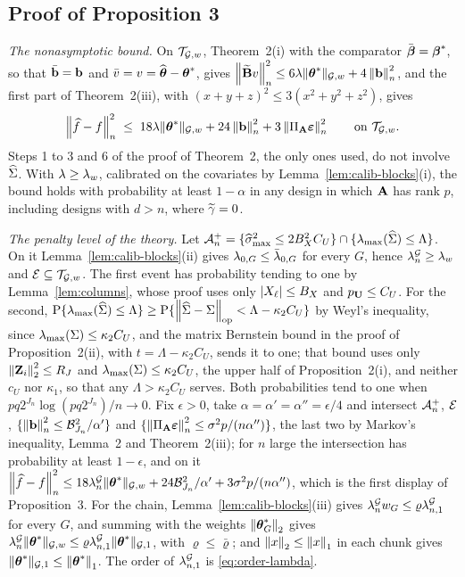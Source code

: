 \subsection*{Proof of Proposition 3}

\emph{The nonasymptotic bound.} On $\mathcal{T}_{\mathcal{G},w}$, Theorem~2(i) with the comparator
$\bar{\boldsymbol{\beta}} = \boldsymbol{\beta}^{*}$, so that $\bar{\mathbf{b}} = \mathbf{b}$ and
$\bar{v} = v = \widehat{\boldsymbol{\theta}}-\boldsymbol{\theta}^{*}$, gives
$\left\lVert \widetilde{\mathbf{B}} v \right\rVert_{n}^{2} \le 6\lambda\lVert \boldsymbol{\theta}^{*}\rVert_{\mathcal{G},w} + 4\left\lVert \mathbf{b} \right\rVert_{n}^{2}$, and the
first part of Theorem~2(iii), with $(x+y+z)^{2} \le 3(x^{2}+y^{2}+z^{2})$, gives
\begin{equation}
  \label{eq:slow-nonasymptotic}
  \left\lVert \widehat{f}-f \right\rVert_{n}^{2} \;\le\; 18\lambda\lVert \boldsymbol{\theta}^{*}\rVert_{\mathcal{G},w}
  + 24\left\lVert \mathbf{b} \right\rVert_{n}^{2} + 3\left\lVert \Pi_{\mathbf{A}}\boldsymbol{\varepsilon} \right\rVert_{n}^{2}
  \qquad\text{on } \mathcal{T}_{\mathcal{G},w} .
\end{equation}
Steps 1 to 3 and 6 of the proof of Theorem~2, the only ones used, do not
involve $\widehat{\Sigma}$. With $\lambda \ge \lambda_{w}$, calibrated on the covariates by
Lemma~\ref{lem:calib-blocks}(i), the bound holds with probability at least
$1-\alpha$ in any design in which $\mathbf{A}$ has rank $p$, including designs with
$d > n$, where $\widetilde{\gamma} = 0$.

\emph{The penalty level of the theory.} Let
$\mathcal{A}_{n}^{+} = \{\widehat{\sigma}_{\max}^{2} \le 2B_X^{2}C_U\}\cap\{\lambda_{\max}(\widehat{\Sigma}) \le \Lambda\}$.
On it Lemma~\ref{lem:calib-blocks}(ii) gives $\lambda_{0,G} \le \bar{\lambda}_{0,G}$ for
every $G$, hence $\lambda^{\mathcal{G}}_{n} \ge \lambda_{w}$ and $\mathcal{E} \subseteq \mathcal{T}_{\mathcal{G},w}$. The first
event has probability tending to one by Lemma~\ref{lem:columns}, whose proof
uses only $|X_{\ell}| \le B_X$ and $p_{\mathbf{U}} \le C_U$. For the second,
$\mathrm{P}\{\lambda_{\max}(\widehat{\Sigma}) \le \Lambda\} \ge
\mathrm{P}\{\left\lVert \widehat{\Sigma}-\Sigma \right\rVert_{\mathrm{op}} < \Lambda - \kappa_2C_U\}$ by Weyl's inequality,
since $\lambda_{\max}(\Sigma) \le \kappa_2C_U$, and the matrix Bernstein bound in the
proof of Proposition~2(ii), with $t = \Lambda - \kappa_2C_U$, sends it to one;
that bound uses only $\left\lVert \mathbf{Z}_{i} \right\rVert_{2}^{2} \le R_J$ and
$\lambda_{\max}(\Sigma) \le \kappa_2C_U$, the upper half of Proposition~2(i), and
neither $c_U$ nor $\kappa_1$, so that any $\Lambda > \kappa_2C_U$ serves. Both
probabilities tend to one when $pq2^{J_n}\log(pq2^{J_n})/n \to 0$. Fix
$\epsilon > 0$, take $\alpha = \alpha' = \alpha'' = \epsilon/4$ and intersect
$\mathcal{A}_{n}^{+}$, $\mathcal{E}$, $\{\left\lVert \mathbf{b} \right\rVert_{n}^{2} \le \mathcal{B}_{J_n}^{2}/\alpha'\}$
and $\{\left\lVert \Pi_{\mathbf{A}}\boldsymbol{\varepsilon} \right\rVert_{n}^{2} \le \sigma^{2}p/(n\alpha'')\}$, the last two by
Markov's inequality, Lemma~2 and Theorem~2(iii); for $n$ large the
intersection has probability at least $1-\epsilon$, and on it
$\left\lVert \widehat{f}-f \right\rVert_{n}^{2} \le 18\lambda^{\mathcal{G}}_{n}\lVert \boldsymbol{\theta}^{*}\rVert_{\mathcal{G},w} +
24\mathcal{B}_{J_n}^{2}/\alpha' + 3\sigma^{2}p/(n\alpha'')$, which is the first
display of Proposition~3. For the chain, Lemma~\ref{lem:calib-blocks}(iii)
gives $\lambda^{\mathcal{G}}_{n} w_{G} \le \varrho\lambda^{\mathcal{G}}_{n,1}$ for every $G$, and summing with the
weights $\left\lVert \boldsymbol{\theta}^{*}_{G} \right\rVert_{2}$ gives
$\lambda^{\mathcal{G}}_{n}\lVert \boldsymbol{\theta}^{*}\rVert_{\mathcal{G},w} \le \varrho\lambda^{\mathcal{G}}_{n,1}\lVert \boldsymbol{\theta}^{*}\rVert_{\mathcal{G},1}$, with
$\varrho \le \bar\varrho$; and $\left\lVert x \right\rVert_{2} \le \left\lVert x \right\rVert_{1}$ in each chunk
gives $\lVert \boldsymbol{\theta}^{*}\rVert_{\mathcal{G},1} \le \left\lVert \boldsymbol{\theta}^{*} \right\rVert_{1}$. The order of $\lambda^{\mathcal{G}}_{n,1}$
is \eqref{eq:order-lambda}.

